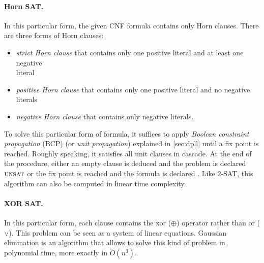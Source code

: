 
\paragraph{Horn SAT\cite{dowling1984linear}.} In this particular form, the given CNF formula contains only Horn clauses. 
There are three forms of Horn clauses: 
\begin{itemize}[topsep=0pt,itemsep=1pt]
\item \emph{strict Horn clause} that contains only one positive literal and at least one negative \\literal
\item \emph{positive Horn clause} that contains only one positive literal and no negative literals
\item \emph{negative Horn clause} that contains only negative literals.
\end{itemize}
To solve this particular form of formula, it suffices to  apply \emph{Boolean constraint propagation} (BCP) (or \emph{unit propagation}) explained in \cref{sec:dpll} until a fix point is reached.
Roughly speaking, it satisfies all unit clauses in cascade. At the end of the procedure, either an empty clause is deduced and the problem
is declared $\textsc{unsat}$ or the fix point is reached and the formula is declared \sat.
 Like 2-SAT, this algorithm can also be computed in linear time complexity.
 
\paragraph{XOR SAT\cite{moore2011nature}.} In this particular form, each clause contains the xor ($\oplus$) operator rather than or ($\lor$).
This problem can be seen as a system of linear equations. Gaussian elimination is an algorithm that allows to solve this kind of
problem in polynomial time, more exactly in $O(n^3)$.

